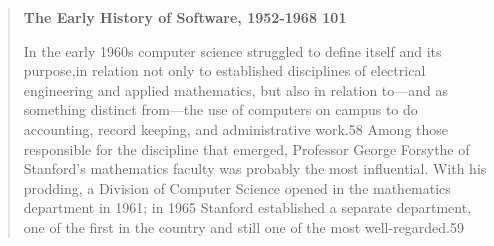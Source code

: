 \begin{quotation}
\textbf{The Early History of Software, 1952-1968 101}

In the early 1960s computer science struggled to define itself and its 
purpose,in relation not only to established disciplines of electrical 
engineering and applied mathematics, but also in relation to—and as something 
distinct from—the use of computers on campus to do accounting, record keeping, 
and administrative work.58 Among those responsible for the discipline that 
emerged, Professor George Forsythe of Stanford's mathematics faculty was 
probably the most influential. With his prodding, a Division of Computer Science 
opened in the mathematics department in 1961; in 1965 Stanford established a 
separate department, one of the first in the country and still one of the 
most well-regarded.59
\cite{history_of_modern_computing_2003_ceruzzi}
\end{quotation}
